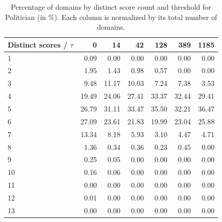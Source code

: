 \begin{table}[htbp]
\centering
\small
\begin{tabular}{l r r r r r r}
\hline
Distinct scores / $\tau$ & 0 & 14 & 42 & 128 & 389 & 1185 \\
\hline
1 & 0.09 & 0.00 & 0.00 & 0.00 & 0.00 & 0.00 \\
2 & 1.95 & 1.43 & 0.98 & 0.57 & 0.00 & 0.00 \\
3 & 9.48 & 11.17 & 10.03 & 7.24 & 7.38 & 3.53 \\
4 & 19.49 & 24.06 & 27.41 & 33.37 & 32.44 & 29.41 \\
5 & 26.79 & 31.11 & 33.47 & 35.50 & 32.21 & 36.47 \\
6 & 27.09 & 23.61 & 21.83 & 19.99 & 23.04 & 25.88 \\
7 & 13.34 & 8.18 & 5.93 & 3.10 & 4.47 & 4.71 \\
8 & 1.36 & 0.34 & 0.36 & 0.23 & 0.45 & 0.00 \\
9 & 0.25 & 0.05 & 0.00 & 0.00 & 0.00 & 0.00 \\
10 & 0.16 & 0.06 & 0.00 & 0.00 & 0.00 & 0.00 \\
11 & 0.00 & 0.00 & 0.00 & 0.00 & 0.00 & 0.00 \\
12 & 0.01 & 0.00 & 0.00 & 0.00 & 0.00 & 0.00 \\
13 & 0.00 & 0.00 & 0.00 & 0.00 & 0.00 & 0.00 \\
\hline
\end{tabular}
\caption{Percentage of domains by distinct score count and threshold for Politician (in \%). Each column is normalized by its total number of domains.}
\label{tab:distinct-scores-percentages-Politician}
\end{table}
